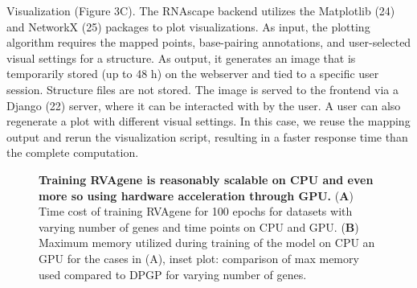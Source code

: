 Visualization (Figure 3C). The RNAscape backend utilizes the Matplotlib (24) and NetworkX (25) packages to plot visualizations. As input, the plotting algorithm requires the mapped points, base-pairing annotations, and user-selected visual settings for a structure. As output, it generates an image that is temporarily stored (up to 48 h) on the webserver and tied to a specific user session. Structure files are not stored. The image is served to the frontend via a Django (22) server, where it can be interacted with by the user. A user can also regenerate a plot with different visual settings. In this case, we reuse the mapping output and rerun the visualization script, resulting in a faster response time than the complete computation.
\begin{center}
    \begin{figure}
        \caption[Computational cost of training RVAgene]{\textbf{Training RVAgene is reasonably scalable on CPU and even more so using hardware acceleration through GPU.} ({\bf A}) Time cost of training RVAgene for 100 epochs for datasets with varying number of genes and time points on CPU and GPU. ({\bf B}) Maximum memory utilized during training of the model on CPU an GPU for the cases in (A), inset plot: comparison of max memory used compared to DPGP for varying number of genes.}
  \label{fig:rnascape2}
\end{figure}
\end{center}